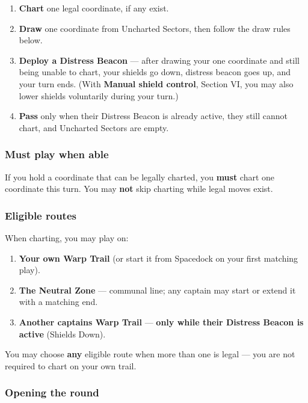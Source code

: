 \documentclass[11pt]{article}
\providecommand{\tightlist}{%
  \setlength{\itemsep}{0pt}\setlength{\parskip}{0pt}}
\begin{document}
\begin{enumerate}
\def\labelenumi{\arabic{enumi}.}
\tightlist
\item
  \textbf{Chart} one legal coordinate, if any exist.
\item
  \textbf{Draw} one coordinate from Uncharted Sectors, then follow the draw
  rules below.
\item
  \textbf{Deploy a Distress Beacon} --- after drawing your one coordinate and
  still being unable to chart, your shields go down, distress beacon goes up,
  and your turn ends. (With \textbf{Manual shield control}, Section VI, you
  may also lower shields voluntarily during your turn.)
\item
  \textbf{Pass} only when their Distress Beacon is already active, they
  still cannot chart, and Uncharted Sectors are empty.
\end{enumerate}

\subsubsection{Must play when able}\label{must-play-when-able}

If you hold a coordinate that can be legally charted, you \textbf{must}
chart one coordinate this turn. You may \textbf{not} skip charting while legal
moves exist.

\subsubsection{Eligible routes}\label{eligible-routes}

When charting, you may play on:

\begin{enumerate}
\def\labelenumi{\arabic{enumi}.}
\tightlist
\item
  \textbf{Your own Warp Trail} (or start it from Spacedock on your first
  matching play).
\item
  \textbf{The Neutral Zone} --- communal line; any captain may start or
  extend it with a matching end.
\item
  \textbf{Another captain\textquotesingle s Warp Trail} --- \textbf{only
  while their Distress Beacon is active} (Shields Down).
\end{enumerate}

You may choose \textbf{any} eligible route when more than one is legal
--- you are not required to chart on your own trail.

\subsubsection{Opening the round}\label{opening-the-round}
\end{document}
